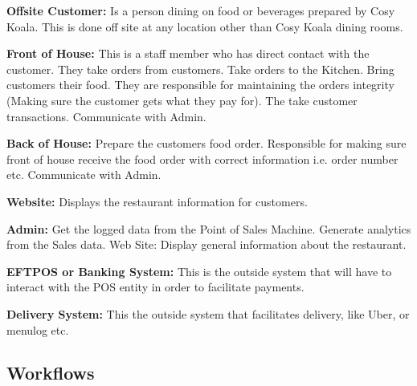 \documentclass{article}
\begin{document}
\textbf{Offsite Customer:} Is a person dining on food or beverages prepared by Cosy Koala. This is done off site at any location other than Cosy Koala dining rooms.

\textbf{Front of House:} This is a staff member who has direct contact with the customer. They take orders from customers. Take orders to the Kitchen. Bring customers their food. They are responsible for maintaining the orders integrity (Making sure the customer gets what they pay for). The take customer transactions. Communicate with Admin.

\textbf{Back of House:} Prepare the customers food order. Responsible for making sure front of house receive the food order with correct information i.e. order number etc. Communicate with Admin.

\textbf{Website:} Displays the restaurant information for customers.

\textbf{Admin:} Get the logged data from the Point of Sales Machine.
Generate analytics from the Sales data.
Web Site: Display general information about the restaurant.

\textbf{EFTPOS or Banking System:} This is the outside system that will have to interact with the POS entity in order to facilitate payments.

\textbf{Delivery System:} This the outside system that facilitates delivery, like Uber, or menulog etc.


\clearpage
\subsection{Workflows}
\end{document}
